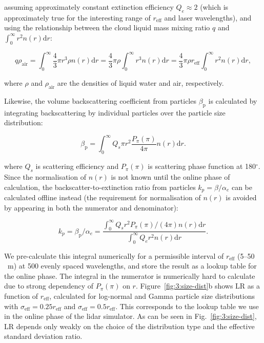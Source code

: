 \noindent
assuming approximately constant extinction efficiency $Q_e \approx 2$ (which is approximately true for the interesting range of $r_\text{eff}$ and laser wavelengths), and using the
relationship between the cloud liquid mass mixing ratio $q$
and $\int_0^\infty r^2 n(r) \mathrm{d}r$:

\begin{equation}
q\rho_\text{air} = \int_0^\infty \frac{4}{3}\pi r^3 \rho n(r)\mathrm{d}r =
\frac{4}{3}\pi\rho\int_0^\infty r^3 n(r) \mathrm{d}r =
\frac{4}{3}\pi\rho r_\text{eff}\int_0^\infty r^2 n(r) \mathrm{d}r ,
\end{equation}

\noindent
where $\rho$ and $\rho_\text{air}$ are the densities of liquid water
and air, respectively.

Likewise, the volume backscattering coefficient
from particles $\beta_\mathrm{p}$ is calculated by integrating backscattering by
individual particles over the particle size distribution:

\begin{equation}
\beta_\mathrm{p} =
\int_0^\infty Q_s \pi r^2 \frac{P_\pi(\pi)}{4\pi} n(r) \mathrm{d}r .
\end{equation}

\noindent
where $Q_s$ is scattering efficiency and $P_\pi(\pi)$ is scattering phase function
at 180$^\circ$.
Since the normalisation of $n(r)$ is not known until the online phase of calculation,
the backscatter-to-extinction ratio from particles $k_p = \beta/\alpha_e$ can be
calculated offline instead (the requirement for normalisation of $n(r)$ is
avoided by appearing in both the numerator and denominator):

\begin{equation}
k_p = \beta_\mathrm{p}/\alpha_e = \frac{\int_0^\infty Q_s r^2 P_\pi(\pi)/(4\pi) n(r) \mathrm{d}r}{\int_0^\infty Q_e r^2 n(r) \mathrm{d}r} .
\end{equation}

\noindent
We pre-calculate this integral numerically for a permissible interval of
$r_\text{eff}$ (5--50 \unit{\mu m}) at 500 evenly spaced wavelengths,
and store the result as a lookup table for the online phase.
The integral in the numerator is numerically hard to calculate due
to strong dependency of $P_\pi(\pi)$ on $r$.
Figure~\ref{fig:3:size-dist}b
shows LR as a function of $r_\text{eff}$, calculated
for log-normal and Gamma particle size distributions with $\sigma_\text{eff}
= 0.25 r_\text{eff}$ and $\sigma_\text{eff} = 0.5 r_\text{eff}$.
This corresponds to the lookup table we use in the online phase
of the lidar simulator. As can be seen in Fig.~\ref{fig:3:size-dist},
LR depends only weakly on the choice of the distribution type and the effective standard
deviation ratio.


